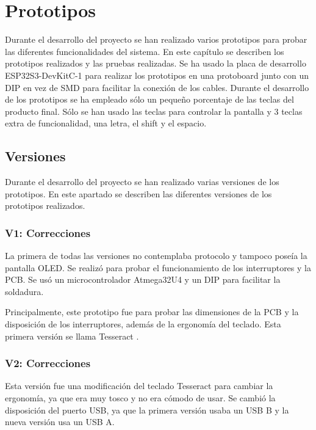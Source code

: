 \chapter{Prototipos}

Durante el desarrollo del proyecto se han realizado varios prototipos para probar las diferentes funcionalidades del sistema. En este capítulo se describen los prototipos realizados y las pruebas realizadas. Se ha usado la placa de desarrollo ESP32S3-DevKitC-1 para realizar los prototipos en una protoboard junto con un  DIP en vez de \gls{SMD} para facilitar la conexión de los cables. Durante el desarrollo de los prototipos se ha empleado sólo un pequeño porcentaje de las teclas del producto final. Sólo se han usado las teclas para controlar la pantalla y 3 teclas extra de funcionalidad, una letra, el shift y el espacio.


\section{Versiones}
Durante el desarrollo del proyecto se han realizado varias versiones de los prototipos. En este apartado se describen las diferentes versiones de los prototipos realizados.

\subsection{V1: Correcciones}
La primera de todas las versiones no contemplaba protocolo  y tampoco poseía la pantalla \gls{OLED}. Se realizó para probar el funcionamiento de los interruptores y la \gls{PCB}. Se usó un microcontrolador Atmega32U4 y un  DIP para facilitar la soldadura.

Principalmente, este prototipo fue para probar las dimensiones de la \gls{PCB} y la disposición de los interruptores, además de la ergonomía del teclado. Esta primera versión se llama Tesseract \cite{Tesseract}.

\subsection{V2: Correcciones}
Esta versión fue una modificación del teclado Tesseract \cite{Tesseract} para cambiar la ergonomía, ya que era muy tosco y no era cómodo de usar. Se cambió la disposición del puerto \gls{USB}, ya que la primera versión usaba un \gls{USB} B y la nueva versión usa un \gls{USB} A.

